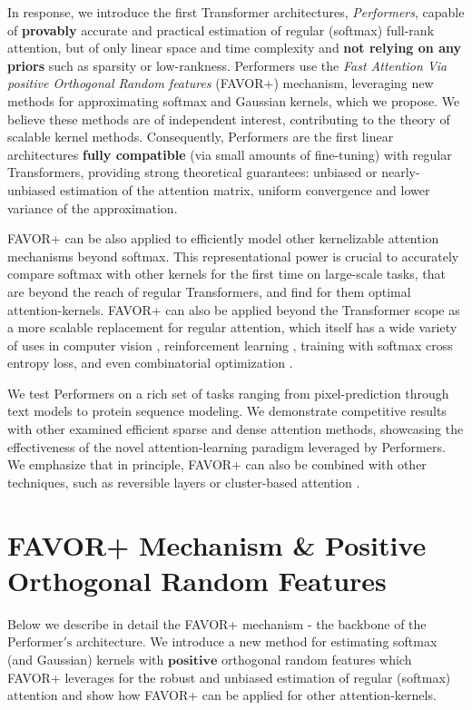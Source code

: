 In response, we introduce the first Transformer architectures, \textit{Performers}, capable of \textbf{provably} accurate and practical estimation of regular (softmax) full-rank attention, but of only linear space and time complexity and \textbf{not relying on any priors} such as sparsity or low-rankness. Performers use the \textit{Fast Attention Via positive Orthogonal Random features} (FAVOR+) mechanism, leveraging new methods for approximating softmax and Gaussian kernels, which we propose. We believe these methods are of independent interest, contributing to the theory of scalable kernel methods. Consequently, Performers are the first linear architectures \textbf{fully compatible} (via small amounts of fine-tuning) with regular Transformers, providing strong theoretical guarantees: unbiased or nearly-unbiased estimation of the attention matrix, uniform convergence and lower variance of the approximation.

FAVOR+ can be also applied to efficiently model other kernelizable attention mechanisms beyond softmax. This representational power is crucial to accurately compare softmax with other kernels for the first time on large-scale tasks, that are beyond the reach of regular Transformers, and find for them optimal attention-kernels. FAVOR+ can also be applied beyond the Transformer scope as a more scalable replacement for regular attention, which itself has a wide variety of uses in computer vision \citep{attention_cvpr}, reinforcement learning \citep{relational}, training with softmax cross entropy loss, and even combinatorial optimization \citep{pointer}.

We test Performers on a rich set of tasks ranging from pixel-prediction through text models to protein sequence modeling. We demonstrate competitive results with other examined efficient sparse and dense attention methods, showcasing the effectiveness of the novel attention-learning paradigm leveraged by Performers. We emphasize that in principle, FAVOR+ can also be combined with other techniques, such as reversible layers \citep{reformer} or cluster-based attention \citep{routing_t}. 

\section{FAVOR+ Mechanism \& Positive Orthogonal Random Features}
\label{sec:algorithm}
Below we describe in detail the FAVOR+ mechanism - the backbone of the $\mathrm{Performer's}$ architecture. We introduce a new method for estimating softmax (and Gaussian) kernels with $\textbf{positive}$ orthogonal random features which FAVOR+ leverages for the robust and unbiased estimation of regular (softmax) attention and show how FAVOR+ can be applied for other attention-kernels.

